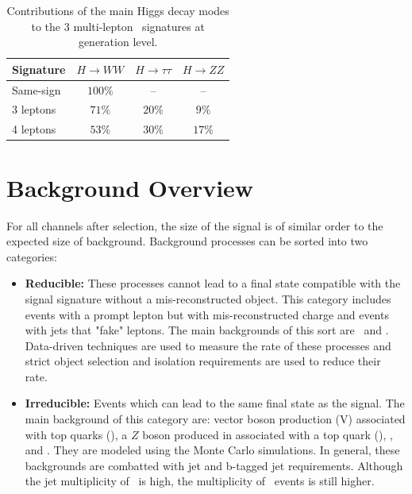 \begin{table}[htbp]
  \begin{center} 
    \caption{Contributions of the main Higgs decay modes to the 3 multi-lepton
      \tth\ signatures at generation level.
      }\label{ana:table_decay} 
      \begin{tabular}{l|c|c|c} 
      \hline\hline
  Signature & $H \rightarrow WW$  & $H\rightarrow \tau\tau$  & $H \rightarrow
  ZZ$  \\\hline
  Same-sign &  $100\%$ & -- & -- \\
  3 leptons  &  $71\%$ & $20\%$ & $9\%$ \\
  4 leptons  &  $53\%$ & $30\%$ & $17\%$  \\
     \hline
    \end{tabular}
  \end{center}
\end{table}



\section{Background Overview}

For all channels after selection, the size of the signal is of similar order to the expected size of background.
Background processes can be sorted into two categories:

\begin{itemize}

\item \textbf{Reducible:} These processes cannot lead to a final state compatible with the
  signal signature without a mis-reconstructed object. This category includes
  events with a prompt lepton but with mis-reconstructed charge and events
  with jets that "fake" leptons.  The main backgrounds of this sort are \ttbar\ and \zj. Data-driven techniques are used to measure the rate of these processes and strict object
  selection and isolation requirements are used to reduce their rate. 

\item \textbf{Irreducible:} Events which can lead to the same final state as the signal.
 The main background of this category are: vector boson production (V) associated with top quarks (\ttV), a $Z$ boson produced in associated with a top quark (\tZ), \WZ, and \ZZ.
 They are modeled using the Monte Carlo simulations. In general,
 these backgrounds are combatted with jet and b-tagged jet requirements. 
 Although the jet multiplicity of \ttV\ is high, the multiplicity of \tth\ 
 events is still higher. 

\end{itemize}


